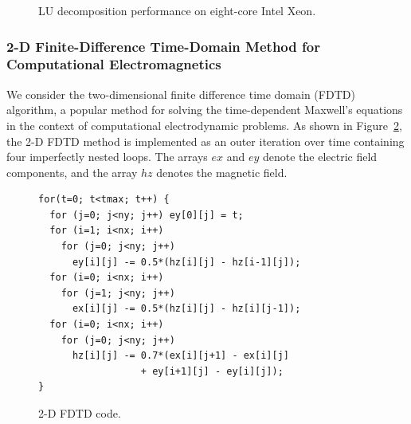 \begin{figure}%
\begin{center} 
    
\end{center} 
\caption{LU decomposition performance on eight-core Intel Xeon.} 
\label{fig:lu-cookie-results} 
\end{figure} 


 
\subsubsection{2-D Finite-Difference Time-Domain Method for Computational Electromagnetics}  
We consider the two-dimensional finite difference time domain (FDTD)
algorithm, a popular method for solving the time-dependent Maxwell's
equations in the context of computational electrodynamic problems. As
shown in Figure~\ref{fig:fdtd-2d-code}, the 2-D FDTD method is
implemented as an outer iteration over time containing four
imperfectly nested loops.  The arrays $ex$ and $ey$ denote the
electric field components, and the array $hz$ denotes the magnetic
field.


\begin{figure}
\begin{center}
\begin{minipage}{3in} 
\scriptsize
\begin{verbatim} 
for(t=0; t<tmax; t++) { 
  for (j=0; j<ny; j++) ey[0][j] = t; 
  for (i=1; i<nx; i++) 
    for (j=0; j<ny; j++) 
      ey[i][j] -= 0.5*(hz[i][j] - hz[i-1][j]); 
  for (i=0; i<nx; i++) 
    for (j=1; j<ny; j++) 
      ex[i][j] -= 0.5*(hz[i][j] - hz[i][j-1]); 
  for (i=0; i<nx; i++) 
    for (j=0; j<ny; j++) 
      hz[i][j] -= 0.7*(ex[i][j+1] - ex[i][j]
                  + ey[i+1][j] - ey[i][j]); 
} 
\end{verbatim} 
\end{minipage} 
\end{center}
\caption{2-D FDTD code.} 
\label{fig:fdtd-2d-code} 
\end{figure}

